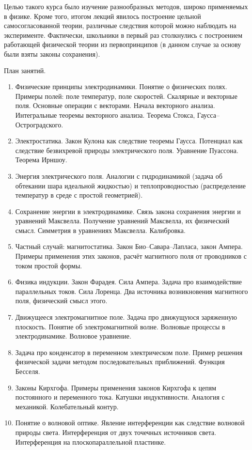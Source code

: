 \documentclass[12pt,a4paper,oneside,draft]{scrartcl}
\begin{document}
Целью такого курса было изучение разнообразных методов, широко
применяемых в физике. Кроме того, итогом лекций явилось построение
цельной самосогласованной теории, различные следствия которой можно
наблюдать на эксперименте. Фактически, школьники в первый раз
столкнулись с построением работающей физической теории из
первопринципов (в данном случае за основу были взяты законы
сохранения). 

\begin{center}
  \textsf{План занятий.}
\end{center}

\begin{enumerate}
\item Физические принципы электродинамики. Понятие о физических
  полях. Примеры полей: поле температур, поле скоростей. Скалярные и
  векторные поля. Основные операции с векторами. Начала векторного
  анализа. Интегральные теоремы векторного анализа. Теорема Стокса,
  Гаусса–Остроградского.
\item Электростатика. Закон Кулона как следствие теоремы
  Гаусса. Потенциал как следствие безвихревой природы электрического
  поля. Уравнение Пуассона. Теорема Ирншоу.
\item Энергия электрического поля. Аналогии с гидродинамикой (задача
  об обтекании шара идеальной жидкостью) и теплопроводностью
  (распределение температур в среде с простой геометрией).
\item Сохранение энергии в электродинамике. Связь закона сохранения
  энергии и уравнений Максвелла. Получение уравнений Максвелла, их
  физический смысл. Симметрия в уравнениях Максвелла. Калибровка.
\item Частный случай: магнитостатика. Закон Био–Савара–Лапласа, закон
  Ампера. Примеры применения этих законов, расчёт магнитного поля от
  проводников с током простой формы.
\item Физика индукции. Закон Фарадея. Сила Ампера. Задача про
  взаимодействие параллельных токов. Сила Лоренца. Два источника
  возникновения магнитного поля, физический смысл этого.
\item Движущееся электромагнитное поле. Задача про движущуюся
  заряженную плоскость. Понятие об электромагнитной волне. Волновые
  процессы в электродинамике. Волновое уравнение.
\item Задача про конденсатор в переменном электрическом поле. Пример
  решения физической задачи методом последовательных
  приближений. Функция Бесселя.
\item Законы Кирхгофа. Примеры применения законов Кирхгофа к цепям
  постоянного и переменного тока. Катушки индуктивности. Аналогия с
  механикой. Колебательный контур.
\item Понятие о волновой оптике. Явление интерференции как следствие
  волновой природы света. Интерференция от двух точечных источников
  света. Интерференция на плоскопараллельной пластинке.
\end{enumerate}
\end{document}
